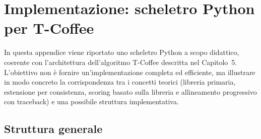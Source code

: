 \section{Implementazione: scheletro Python per T-Coffee}
\label{app:tcoffee_python}

In questa appendice viene riportato uno scheletro Python a scopo didattico,
coerente con l’architettura dell’algoritmo T-Coffee descritta nel Capitolo~5.
L’obiettivo non è fornire un’implementazione completa ed efficiente, ma
illustrare in modo concreto la corrispondenza tra i concetti teorici
(libreria primaria, estensione per consistenza, scoring basato sulla libreria
e allineamento progressivo con traceback) e una possibile struttura
implementativa.

\subsection{Struttura generale}

